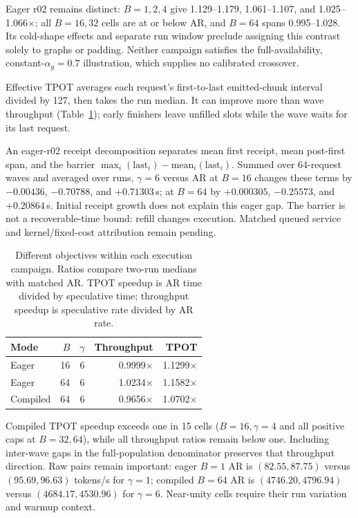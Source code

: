 \documentclass[conference,letterpaper]{IEEEtran}
\begin{document}
Eager r02 remains distinct: $B=1,2,4$ give 1.129--1.179, 1.061--1.107, and 1.025--1.066$\times$; all $B=16,32$ cells are at or below AR, and $B=64$ spans 0.995--1.028. Its cold-shape effects and separate run window preclude assigning this contrast solely to graphs or padding. Neither campaign satisfies the full-availability, constant-$\alpha_g=0.7$ illustration, which supplies no calibrated crossover.

Effective TPOT averages each request's first-to-last emitted-chunk interval divided by 127, then takes the run median. It can improve more than wave throughput (Table~\ref{tab:objectives}); early finishers leave unfilled slots while the wave waits for its last request.

An eager-r02 receipt decomposition separates mean first receipt, mean post-first span, and the barrier $\max_i(\mathrm{last}_i)-\mathrm{mean}_i(\mathrm{last}_i)$. Summed over 64-request waves and averaged over runs, $\gamma=6$ versus AR at $B=16$ changes these terms by $-0.00436$, $-0.70788$, and $+0.71303$\,s; at $B=64$ by $+0.000305$, $-0.25573$, and $+0.20864$\,s. Initial receipt growth does not explain this eager gap. The barrier is not a recoverable-time bound: refill changes execution. Matched queued service and kernel/fixed-cost attribution remain pending.

\begin{table}[t]
\centering\small
\caption{Different objectives within each execution campaign. Ratios compare two-run medians with matched AR. TPOT speedup is AR time divided by speculative time; throughput speedup is speculative rate divided by AR rate.}
\label{tab:objectives}
\begin{tabular}{@{}lrrrr@{}}
\toprule
Mode & $B$ & $\gamma$ & Throughput & TPOT \\\midrule
Eager & 16 & 6 & 0.9999$\times$ & 1.1299$\times$ \\
Eager & 64 & 6 & 1.0234$\times$ & 1.1582$\times$ \\
Compiled & 64 & 6 & 0.9656$\times$ & 1.0702$\times$ \\
\bottomrule
\end{tabular}
\end{table}

Compiled TPOT speedup exceeds one in 15 cells ($B=16,\gamma=4$ and all positive caps at $B=32,64$), while all throughput ratios remain below one. Including inter-wave gaps in the full-population denominator preserves that throughput direction. Raw pairs remain important: eager $B=1$ AR is $(82.55,87.75)$ versus $(95.69,96.63)$ tokens/s for $\gamma=1$; compiled $B=64$ AR is $(4746.20,4796.94)$ versus $(4684.17,4530.96)$ for $\gamma=6$. Near-unity cells require their run variation and warmup context.
\end{document}
